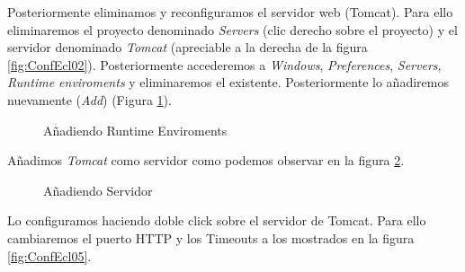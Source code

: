 \documentclass{scrartcl}
\begin{document}
Posteriormente eliminamos y reconfiguramos el servidor web (Tomcat). Para ello eliminaremos el proyecto denominado \textit{Servers} (clic derecho sobre el proyecto) y el servidor denominado \textit{Tomcat} (apreciable a la derecha de la figura \ref{fig:ConfEcl02}). Posteriormente accederemos a \textit{Windows}, \textit{Preferences}, \textit{Servers}, \textit{Runtime enviroments} y eliminaremos el existente. Posteriormente lo añadiremos nuevamente (\textit{Add}) (Figura \ref{fig:ConfEcl03}).
\begin{figure}[H]
	
	\centering
	\caption{Añadiendo Runtime Enviroments}
	\label{fig:ConfEcl03}
	
\end{figure}

Añadimos \textit{Tomcat} como servidor como podemos observar en la figura \ref{fig:ConfEcl04}.

\begin{figure}[H]
	\centering
	\caption{Añadiendo Servidor}
	\label{fig:ConfEcl04}
	
\end{figure}
Lo configuramos haciendo doble click sobre el servidor de Tomcat. Para ello cambiaremos el puerto HTTP y los Timeouts a los mostrados en la figura \ref{fig:ConfEcl05}.
\end{document}
